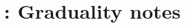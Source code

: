\documentclass[a4paper,11pt]{scrartcl}
\theoremstyle{plain}
\theoremstyle{definition}
\begin{document}
\title{\PurePy: Graduality notes}
\maketitle





\end{document}
